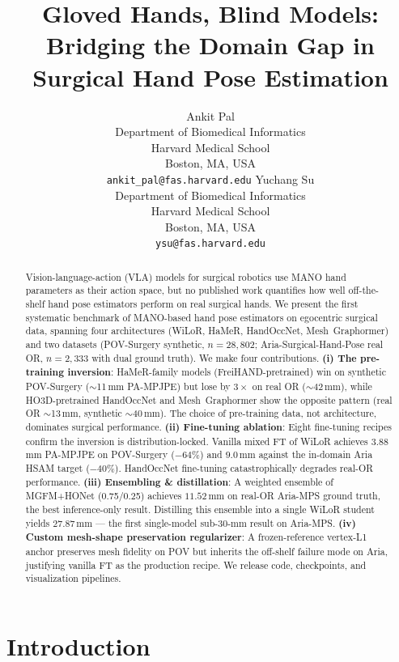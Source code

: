 \documentclass{article}
\title{Gloved Hands, Blind Models: Bridging the Domain Gap in Surgical Hand Pose Estimation}
\author{%
  Ankit Pal\\
  Department of Biomedical Informatics \\
  Harvard Medical School \\
  Boston, MA, USA \\
  \texttt{ankit\_pal@fas.harvard.edu}
  \And
  Yuchang Su \\
  Department of Biomedical Informatics \\
  Harvard Medical School \\
  Boston, MA, USA \\
  \texttt{ysu@fas.harvard.edu}
}
\begin{document}
\maketitle

\begin{abstract}
Vision-language-action (VLA) models for surgical robotics use MANO hand parameters as their action space, but no published work quantifies how well off-the-shelf hand pose estimators perform on real surgical hands. We present the first systematic benchmark of MANO-based hand pose estimators on egocentric surgical data, spanning four architectures (WiLoR, HaMeR, HandOccNet, Mesh~Graphormer) and two datasets (POV-Surgery synthetic, $n{=}28{,}802$; Aria-Surgical-Hand-Pose real OR, $n{=}2{,}333$ with dual ground truth). We make four contributions. \textbf{(i) The pre-training inversion}: HaMeR-family models (FreiHAND-pretrained) win on synthetic POV-Surgery ($\sim$11\,mm PA-MPJPE) but lose by $3{\times}$ on real OR ($\sim$42\,mm), while HO3D-pretrained HandOccNet and Mesh~Graphormer show the opposite pattern (real OR $\sim$13\,mm, synthetic $\sim$40\,mm). The choice of pre-training data, not architecture, dominates surgical performance. \textbf{(ii) Fine-tuning ablation}: Eight fine-tuning recipes confirm the inversion is distribution-locked. Vanilla mixed FT of WiLoR achieves $\mathbf{3.88}$\,mm PA-MPJPE on POV-Surgery ($-64\%$) and $\mathbf{9.0}$\,mm against the in-domain Aria HSAM target ($-40\%$). HandOccNet fine-tuning catastrophically degrades real-OR performance. \textbf{(iii) Ensembling \& distillation}: A weighted ensemble of MGFM+HONet (0.75/0.25) achieves $\mathbf{11.52}$\,mm on real-OR Aria-MPS ground truth, the best inference-only result. Distilling this ensemble into a single WiLoR student yields $\mathbf{27.87}$\,mm — the first single-model sub-30-mm result on Aria-MPS. \textbf{(iv) Custom mesh-shape preservation regularizer}: A frozen-reference vertex-L1 anchor preserves mesh fidelity on POV but inherits the off-shelf failure mode on Aria, justifying vanilla FT as the production recipe. We release code, checkpoints, and visualization pipelines.
\end{abstract}

\section{Introduction}
\label{sec:intro}
\end{document}
